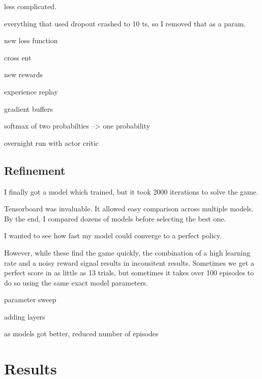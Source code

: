 \documentclass[12pt,a4paper]{article}
\begin{document}
less complicated. 


everything that used dropout crashed to 10 ts, so I removed that as a param.

new loss function

cross ent

new rewards

experience replay

gradient buffers

softmax of two probabilties --> one probability 


overnight run with actor critic


\subsection*{Refinement}
I finally got a model which trained, but it took 2000 iterations to solve the game.


Tensorboard was invaluable. It allowed easy comparison across multiple models. By the end, I compared dozens of models before selecting the best one. 

I wanted to see how fast my model could converge to a perfect policy.

However, while these find the game quickly, the combination of a high learning rate and a noisy reward signal results in inconsitent results. Sometimes we get a perfect score in as little as 13 trials, but sometimes it takes over 100 episodes to do so using the same exact model parameters. 

parameter sweep

adding layers

as models got better, reduced number of episodes


\section{Results}
%
\end{document}
